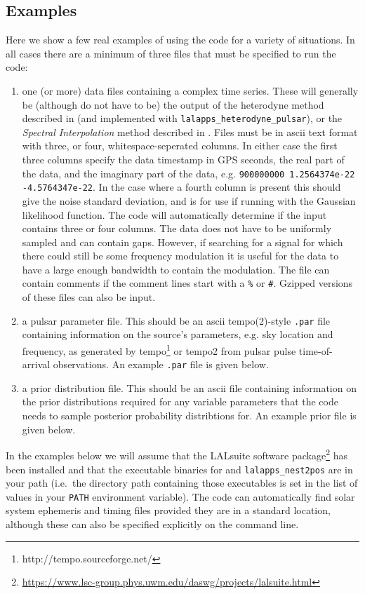 \subsection{Examples}\label{app:examples}

Here we show a few real examples of using the code for a variety of situations. In all cases there are a minimum of
three files that must be specified to run the code:
\begin{enumerate}
 \item one (or more) data files containing a complex time series. These will generally be (although do not have to be) the output
 of the heterodyne method described in \citep{2005PhRvD..72j2002D} (and implemented with {\tt lalapps\_heterodyne\_pulsar}), or
 the {\it Spectral Interpolation} method described in \citep{2017CQGra..34a5010D}. Files must be in ascii text format with three, or
 four, whitespace-seperated columns. In either case the first three columns
 specify the data timestamp in GPS seconds, the real part of the data, and the imaginary part of the data, e.g.
 \verb|900000000 1.2564374e-22 -4.5764347e-22|. In the case where a fourth column is present this should give the noise standard
 deviation, and is for use if running with the Gaussian likelihood function. The code will automatically determine if the input
 contains three or four columns. The data does not have to be uniformly sampled and can 
contain gaps. However,
 if searching for a signal for which there could still be some frequency modulation it is useful for the data to have a large
 enough bandwidth to contain the modulation.
 The file can contain comments if the comment lines start with
 a \verb|%| or \verb|#|. Gzipped versions of these files can also be input.
 \item a pulsar parameter file. This should be an ascii {\sc tempo(2)}-style \verb|.par| file containing information on the
 source's parameters, e.g. sky location and frequency, as generated by {\sc tempo}\footnote{http://tempo.sourceforge.net/} or
 {\sc tempo2} \citep{2006MNRAS.369..655H}  from pulsar pulse time-of-arrival observations. An example \verb|.par| file is given below.
 \item a prior distribution file. This should be an ascii file containing information on the prior distributions
 required for any variable parameters that the code needs to sample posterior probability distribtions for. An example
 prior file is given below.
\end{enumerate}

In the examples below we will assume that the LALsuite software package\footnote{\url{https://www.lsc-group.phys.uwm.edu/daswg/projects/lalsuite.html}} has
been installed and that the executable binaries for \lppen and {\tt lalapps\_nest2pos} are in your path (i.e.\ the directory path containing those
executables is set in the list of values in your {\tt PATH} environment variable). The code can automatically find solar system ephemeris and timing
files provided they are in a standard location, although these can also be specified explicitly on the command line.

